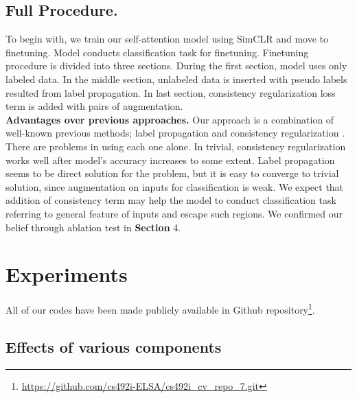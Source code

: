 \documentclass[10pt,twocolumn,letterpaper]{article}
\begin{document}
\subsection{Full Procedure.} To begin with, we train our self-attention model using SimCLR and move to finetuning. Model conducts classification task for finetuning. Finetuning procedure is divided into three sections. During the first section, model uses only labeled data. In the middle section, unlabeled data is inserted with pseudo labels resulted from label propagation. In last section, consistency regularization loss term is added with pairs of augmentation.\\
\textbf{Advantages over previous approaches.} Our approach is a combination of well-known previous methods; label propagation \cite{Iscen2019} and consistency regularization \cite{Xie2020}. There are problems in using each one alone. In trivial, consistency regularization works well after model's accuracy increases to some extent. Label propagation seems to be direct solution for the problem, but it is easy to converge to trivial solution, since augmentation on inputs for classification is weak. We expect that addition of consistency term may help the model to conduct classification task referring to general feature of inputs and escape such regions. We confirmed our belief through ablation test in \textbf{Section} 4.

\section{Experiments}
All of our codes have been made publicly available in Github repository\footnote{\hyperlink{https://github.com/cs492i-ELSA/cs492i_cv_repo_7.git}{https://github.com/cs492i-ELSA/cs492i\_cv\_repo\_7.git}}.

\subsection{Effects of various components}
\end{document}
